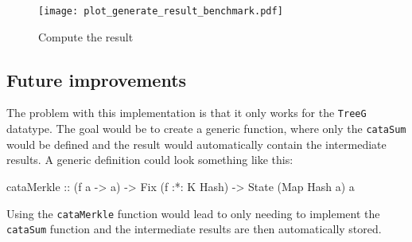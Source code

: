 \begin{figure}[H]
  \centering
  
  \texttt{[image: plot\_generate\_result\_benchmark.pdf]}
  \caption{Compute the result}
  \label{fig-compute-result}
\end{figure}

\subsection{Future improvements}

The problem with this implementation is that it only works for the \texttt{TreeG} datatype. The goal would be to create a generic function, where only the \texttt{cataSum} would be defined and the result would automatically contain the intermediate results. A generic definition could look something like this:

\begin{haskell}
cataMerkle :: (f a -> a) -> Fix (f :*: K Hash) -> State (Map Hash a) a
\end{haskell}

Using the \texttt{cataMerkle} function would lead to only needing to implement the \texttt{cataSum} function and the intermediate results are then automatically stored.